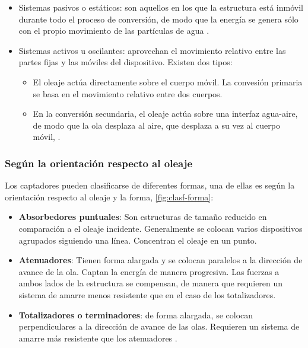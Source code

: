 \begin{itemize}
\item
  Sistemas pasivos o estáticos: son aquellos en los que la estructura
  está inmóvil durante todo el proceso de conversión, de modo que la
  energía se genera sólo con el propio movimiento de las partículas de
  agua \cite{cavia08}.
\item
  Sistemas activos u oscilantes: aprovechan el movimiento relativo entre
  las partes fijas y las móviles del dispositivo. Existen dos tipos:

  \begin{itemize}
  \item
    El oleaje actúa directamente sobre el cuerpo móvil. La convesión
    primaria se basa en el movimiento relativo entre dos cuerpos.
  \item
    En la conversión secundaria, el oleaje actúa sobre una interfaz
    agua-aire, de modo que la ola desplaza al aire, que desplaza a su
    vez al cuerpo móvil, \cite{fernandez13}. 
  \end{itemize}
\end{itemize}


\subsubsection{Según la orientación respecto al
oleaje}\label{header-n106}

Los captadores pueden clasificarse de diferentes formas, una de ellas es
según la orientación respecto al oleaje y la forma, \autoref{fig:clasf-forma}:

\begin{itemize}
\item
  \textbf{Absorbedores puntuales}: Son estructuras de tamaño reducido en
  comparación a el oleaje incidente. Generalmente se colocan varios
  dispositivos agrupados siguiendo una línea. Concentran el oleaje en un
  punto.
\item
  \textbf{Atenuadores}: Tienen forma alargada y se colocan paralelos a
  la dirección de avance de la ola. Captan la energía de manera
  progresiva. Las fuerzas a ambos lados de la estructura se compensan,
  de manera que requieren un sistema de amarre menos resistente que en
  el caso de los totalizadores.
\item
  \textbf{Totalizadores o terminadores}: de forma alargada, se colocan
  perpendiculares a la dirección de avance de las olas. Requieren un
  sistema de amarre más resistente que los atenuadores \cite{cavia08}.
\end{itemize}

